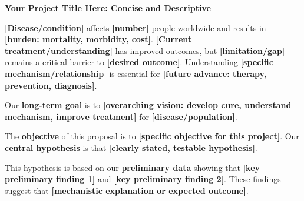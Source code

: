 \documentclass[11pt,letterpaper]{article}
\begin{document}


\begin{center}
\textbf{\large Your Project Title Here: Concise and Descriptive}
\end{center}

\vspace{0.3cm}


\textbf{[Disease/condition]} affects \textbf{[number]} people worldwide and results in \textbf{[burden: mortality, morbidity, cost]}. \textbf{[Current treatment/understanding]} has improved outcomes, but \textbf{[limitation/gap]} remains a critical barrier to \textbf{[desired outcome]}. Understanding \textbf{[specific mechanism/relationship]} is essential for \textbf{[future advance: therapy, prevention, diagnosis]}.

\vspace{0.2cm}


Our \textbf{long-term goal} is to \textbf{[overarching vision: develop cure, understand mechanism, improve treatment]} for \textbf{[disease/population]}.

\vspace{0.2cm}


The \textbf{objective} of this proposal is to \textbf{[specific objective for this project]}. Our \textbf{central hypothesis} is that \textbf{[clearly stated, testable hypothesis]}.

\vspace{0.2cm}


This hypothesis is based on our \textbf{preliminary data} showing that \textbf{[key preliminary finding 1]} and \textbf{[key preliminary finding 2]}. These findings suggest that \textbf{[mechanistic explanation or expected outcome]}.

\vspace{0.2cm}
\end{document}

